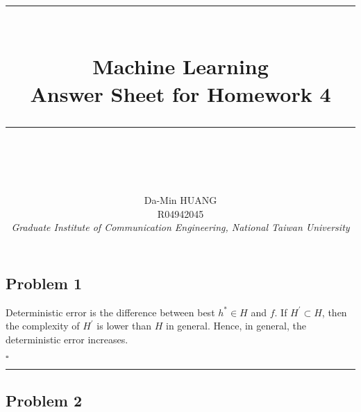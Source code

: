 \documentclass[12pt]{article}
\newcommand*{\QEDB}{\hfill\ensuremath{\square}}
\newcommand{\horrule}[1]{\rule{\linewidth}{#1}}
\begin{document}
\baselineskip 6.5mm
\setlength{\parindent}{0pt}
\title{ 
\normalfont \normalsize 
\horrule{0.5pt} \\[0.4cm]
\huge { \Huge Machine Learning \\ \large Answer Sheet for Homework 4 }\\ %
\horrule{2pt} \\ [0.5cm]
}
\author{ { \Large Da-Min HUANG } \\
{\small R04942045} \\
{\small\textit{Graduate Institute of Communication Engineering, National Taiwan University}}
}
\maketitle

\subsection*{Problem 1}

Deterministic error is the difference between best $h^* \in H$ and $f$. If $H^\prime\subset H$, then the complexity of $H^\prime$ is lower than $H$ in general. Hence, in general, the deterministic error increases.

\QEDB

\horrule{0.5pt}

\subsection*{Problem 2}
\end{document}
